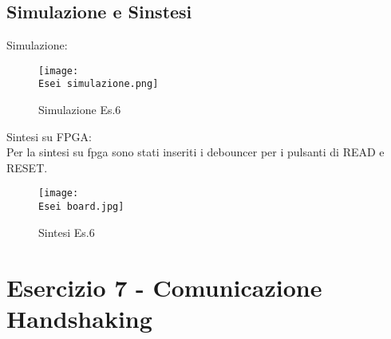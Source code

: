 \documentclass[12pt]{article}
\def \Esei {Allegati/Esercizio6/}
\begin{document}
\subsection{Simulazione e Sinstesi}
Simulazione:
\begin{figure}[ht!]
    \centering
    \texttt{[image: \\Esei simulazione.png]}
    \caption{Simulazione Es.6}
\end{figure}
\clearpage
Sintesi su FPGA:
\\Per la sintesi su fpga sono stati inseriti i debouncer per i pulsanti di READ e RESET.
\begin{figure}[ht!]
    \texttt{[image: \\Esei board.jpg]}
    \caption{Sintesi Es.6}
\end{figure}
\clearpage
\section{Esercizio 7 - Comunicazione Handshaking}
\end{document}
